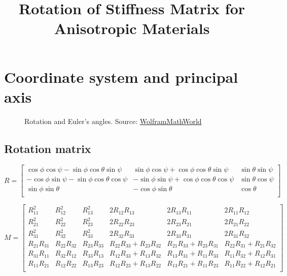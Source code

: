 \documentclass[12pt,a4paper]{article}
\begin{document}
\title{Rotation of Stiffness Matrix for Anisotropic Materials}

\section{Coordinate system and principal axis}

\begin{figure}
	\caption{Rotation and Euler's angles. Source: \href{http://mathworld.wolfram.com/EulerAngles.html}{WolframMathWorld}}
\end{figure}
\subsection{Rotation matrix}

\begin{equation}
\label{eq:RotMat}
R = 
\begin{bmatrix}
  \cos{\phi}\cos{\psi}-\sin{\phi}\cos{\theta}\sin{\psi} & \sin{\phi}\cos{\psi}+\cos{\phi}\cos{\theta}\sin{\psi} & 
  \sin{\theta}\sin{\psi}\\ 
  -\cos{\phi}\sin{\psi} - \sin{\phi}\cos{\theta}\cos{\psi}& 
  -\sin{\phi}\sin{\psi} + \cos{\phi}\cos{\theta}\cos{\psi}& 
  \sin{\theta}\cos{\psi}  \\
  \sin{\phi}\sin{\theta} & 
  -\cos{\phi}\sin{\theta} &
  \cos{\theta} \\ 
\end{bmatrix} 
\end{equation}

\begin{equation}
\label{eq:BondMat}
M = 
\begin{bmatrix}
R_{11}^2 & R_{12}^2 & R_{13}^2 & 2 R_{12} R_{13} & 2 R_{13} R_{11} & 2 R_{11} R_{12} \\ 
R_{21}^2 & R_{22}^2 & R_{23}^2 & 2 R_{22} R_{23} & 2 R_{23} R_{21} & 2 R_{21} R_{22} \\
R_{31}^2 & R_{32}^2 & R_{33}^2 & 2 R_{32} R_{33} & 2 R_{33} R_{31} & 2 R_{31} R_{32} \\
R_{21} R_{31} & R_{22} R_{32} & R_{23} R_{33} & R_{22} R_{33} + R_{23} R_{32} & R_{21} R_{33} + R_{23} R_{31} & R_{22}R_{31} + R_{21} R_{32} \\
R_{31} R_{11} & R_{32} R_{12} & R_{33} R_{13} & R_{12} R_{33} + R_{13} R_{32} & R_{13} R_{31} + R_{11} R_{33} & R_{11}R_{32} + R_{12} R_{31} \\  
R_{11} R_{21} & R_{12} R_{22} & R_{13} R_{23} & R_{12} R_{23} + R_{13} R_{22} & R_{13} R_{21} + R_{11} R_{23} & R_{11}R_{22} + R_{12} R_{21} \\    
\end{bmatrix} 
\end{equation}
\end{document}
